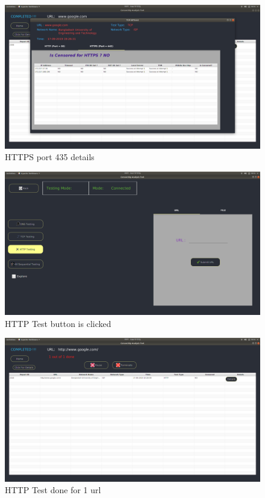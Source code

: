 \begin{figure}[h]
    \centering
    \includegraphics[width=\textwidth]{usersite/21tcpdetailshttps.png}
    \caption{HTTPS port 435 details}
    \label{fig:user20}
\end{figure}

\begin{figure}[h]
    \centering
    \includegraphics[width=\textwidth]{usersite/22httptest.png}
    \caption{HTTP Test button is clicked}
    \label{fig:user21}
\end{figure}

\begin{figure}[h]
    \centering
    \includegraphics[width=\textwidth]{usersite/23httptestdone.png}
    \caption{HTTP Test done for 1 url}
    \label{fig:user22}
\end{figure}

